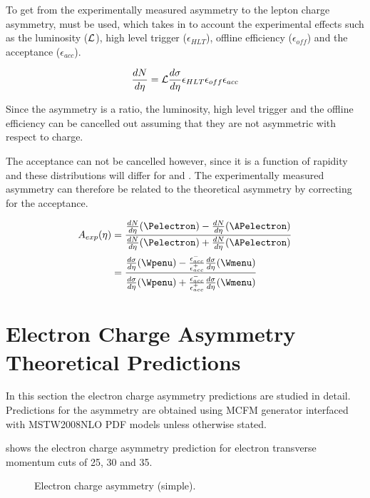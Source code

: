 To get from the experimentally measured asymmetry to the lepton charge
asymmetry,  must be used, which takes in to
account the experimental effects such as the luminosity (${\cal L}$), high
level trigger ($\epsilon_{HLT}$), offline efficiency ($ \epsilon_{off}$) and
the acceptance ($\epsilon_{acc}$).

\begin{equation}
\frac{dN}{d\eta} = {\cal L } \frac{d\sigma}{d\eta}  \epsilon_{HLT}
\epsilon_{off} \epsilon_{acc}
\label{eq:NumEve}
\end{equation} 

Since the asymmetry is a ratio, the luminosity, high level trigger and the
offline efficiency can be cancelled out assuming that they are not asymmetric
with respect to charge.\cite{me} 

The acceptance can not be cancelled however, since it is a function of rapidity and 
these distributions will differ for \Pelectron and \APelectron.
The experimentally measured asymmetry can therefore be related to the
theoretical asymmetry by correcting for the acceptance.\cite{me}

\begin{align} 
A_{exp}(\eta) &= \frac{ \frac{dN}{d\eta}(\Pelectron) -
\frac{dN}{d\eta}(\APelectron) }{ \frac{dN}{d\eta}(\Pelectron) +
\frac{dN}{d\eta}(\APelectron) }\\   
              &= \frac{ \frac{d\sigma}{d\eta}(\Wpenu) -
\frac{\epsilon^{-}_{acc}}{\epsilon^{+}_{acc}} \frac{d\sigma}{d\eta}(\Wmenu) }{
\frac{d\sigma}{d\eta}(\Wpenu) + \frac{\epsilon^{-}_{acc}}{\epsilon^{+}_{acc}}
\frac{d\sigma}{d\eta}(\Wmenu) }
\label{eq:AsymExpCorr}
\end{align}

\section{Electron Charge Asymmetry Theoretical Predictions}

In this section the electron charge asymmetry predictions are studied in detail.
Predictions for the asymmetry are obtained using MCFM \cite{test} generator
interfaced with MSTW2008NLO PDF models unless otherwise stated.

 shows the electron charge asymmetry prediction for
electron transverse momentum cuts of 25, 30 and \unit{35}{\GeV}.


\begin{figure}[htb]
  \centering
  \caption{Electron charge asymmetry (simple).}
  \label{wbos:asym_simple}
\end{figure}

